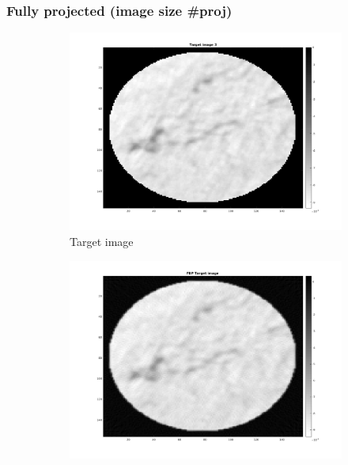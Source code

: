 \documentclass[10pt,a4paper,titlepage]{article}
\begin{document}
		\subsubsection{Fully projected (image size \#proj)}
		\begin{figure}[H]
		
       		\centering
      		\begin{subfigure}[b]{0.475\textwidth}
            	\centering
            	\includegraphics[width=\textwidth]{Sample3/target3.png}
            	\caption{Target image}    
            	\label{subfig:Target1Fully}
        	\end{subfigure}
        	\hfill
        	\begin{subfigure}[b]{0.475\textwidth}  
            	\centering 
            	\includegraphics[width=\textwidth]{Sample3/fully/FBP.png}

\end{subfigure}
\end{figure}
\end{document}
